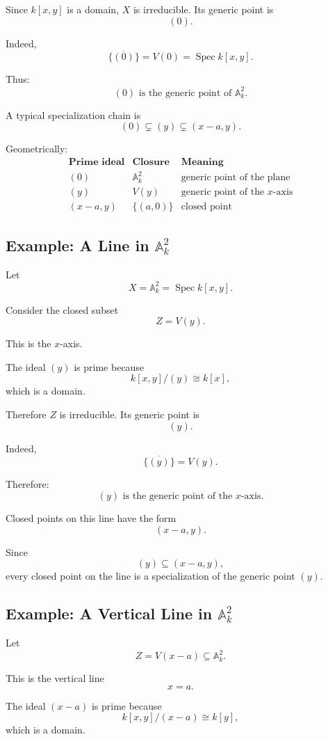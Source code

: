 \documentclass[12pt,a4paper]{article}
\theoremstyle{notespace}
\begin{document}
Since \(k[x,y]\) is a domain, \(X\) is irreducible. Its generic point is
\[
(0).
\]

Indeed,
\[
\overline{\{(0)\}}=V(0)=\operatorname{Spec} k[x,y].
\]

Thus:
\[
\boxed{
	(0)\text{ is the generic point of }\mathbb A^2_k.
}
\]

A typical specialization chain is
\[
(0)\subsetneq (y)\subsetneq (x-a,y).
\]

Geometrically:
\[
\begin{array}{c|c|c}
	\textbf{Prime ideal} & \textbf{Closure} & \textbf{Meaning} \\
	\hline
	(0) & \mathbb A^2_k & \text{generic point of the plane} \\
	(y) & V(y) & \text{generic point of the }x\text{-axis} \\
	(x-a,y) & \{(a,0)\} & \text{closed point}
\end{array}
\]

\subsection{Example: A Line in \(\mathbb A^2_k\)}

Let
\[
X=\mathbb A^2_k=\operatorname{Spec} k[x,y].
\]

Consider the closed subset
\[
Z=V(y).
\]

This is the \(x\)-axis.

The ideal \((y)\) is prime because
\[
k[x,y]/(y)\cong k[x],
\]
which is a domain.

Therefore \(Z\) is irreducible. Its generic point is
\[
(y).
\]

Indeed,
\[
\overline{\{(y)\}}=V(y).
\]

Therefore:
\[
\boxed{
	(y)\text{ is the generic point of the }x\text{-axis}.
}
\]

Closed points on this line have the form
\[
(x-a,y).
\]

Since
\[
(y)\subseteq (x-a,y),
\]
every closed point on the line is a specialization of the generic point \((y)\).

\subsection{Example: A Vertical Line in \(\mathbb A^2_k\)}

Let
\[
Z=V(x-a)\subseteq \mathbb A^2_k.
\]

This is the vertical line
\[
x=a.
\]

The ideal \((x-a)\) is prime because
\[
k[x,y]/(x-a)\cong k[y],
\]
which is a domain.
\end{document}
